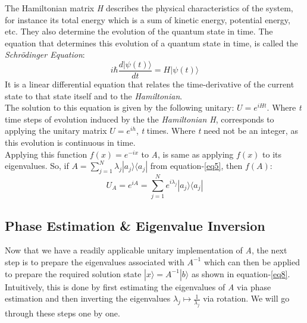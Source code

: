 \documentclass[12pt]{article}
\begin{document}
The Hamiltonian matrix \emph{H} describes the physical characteristics of the system, for instance its total energy which is a sum of kinetic energy, potential energy, etc. They also determine the evolution of the quantum state in time. The equation that determines this evolution of a quantum state in time, is called the \emph{Schr\"odinger Equation}: 
\begin{displaymath}
i\hbar \frac{d|\psi(t)\rangle}{dt} = H |\psi(t)\rangle
\end{displaymath}
It is a linear differential equation that relates the time-derivative of the current state to that state itself and to the \emph{Hamiltonian}.\\
The solution to this equation is given by the following unitary: $U = e^{iHt}$. Where \emph{t} time steps of evolution induced by the the \emph{Hamiltonian H}, corresponds to applying the unitary matrix $U = e^{ih}$, \emph{t} times. Where \emph{t} need not be an integer, as this evolution is continuous in time.
\\
Applying this function $f(x) = e^{-ix}$ to \emph{A}, is same as applying $f(x)$ to its eigenvalues. So, if $A = \sum_{j=1}^{N} \lambda_j |a_j\rangle \langle a_j|$ from equation-\ref{eq5}, then $f(A)$: 
\begin{equation} \label{eq9}
    U_A = e^{iA} = \sum_{j=1}^{N} e^{i\lambda_j} |a_j\rangle \langle a_j|
\end{equation}

\subsection{Phase Estimation \& Eigenvalue Inversion}
Now that we have a readily applicable unitary implementation of \emph{A}, the next step is to prepare the eigenvalues associated with $A^{-1}$ which can then be applied to prepare the required solution state $|x\rangle = A^{-1}|b\rangle$ as shown in equation-\ref{eq8}.\\
Intuitively, this is done by first estimating the eigenvalues of \emph{A} via phase estimation and then inverting the eigenvalues $\lambda_j \mapsto \frac{1}{\lambda_j}$ via rotation. We will go through these steps one by one.\\ 
\end{document}
